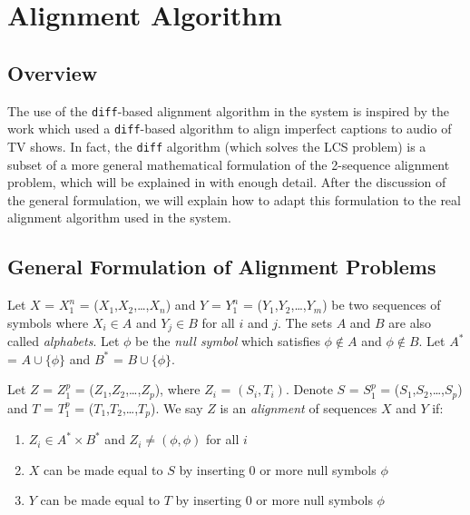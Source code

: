 
\chapter{Alignment Algorithm}
\label{chap:align}

\ifpdf
    \graphicspath{{Chapter5/Figs/Raster/}{Chapter5/Figs/PDF/}{Chapter5/Figs/}}
\else
    \graphicspath{{Chapter5/Figs/Vector/}{Chapter5/Figs/}}
\fi


\section{Overview}

The use of the \texttt{diff}-based alignment algorithm in the system is inspired by the work \cite{lanchantin2015development} which used a \texttt{diff}-based algorithm to align imperfect captions to audio of TV shows. In fact, the \texttt{diff} algorithm (which solves the LCS problem) is a subset of a more general mathematical formulation of the 2-sequence alignment problem, which will be explained in  with enough detail. After the discussion of the general formulation, we will explain how to adapt this formulation to the real alignment algorithm used in the system. 

\section{General Formulation of Alignment Problems}
\label{sec:diff-formulation}

Let $X$ = $X_1^n$ = ($X_1$,$X_2$,\ldots,$X_n$) and $Y$ = $Y_1^n$ = ($Y_1$,$Y_2$,\ldots,$Y_m$) be two sequences of symbols where $X_i \in A$ and $Y_j \in B$ for all $i$ and $j$. The sets $A$ and $B$ are also called \textit{alphabets}. Let $\phi$ be the \textit{null symbol} which satisfies $\phi \notin A$ and $\phi \notin B$. Let $A^*$ = $A\cup\{\phi\}$ and $B^*$ = $B\cup\{\phi\}$.

Let $Z$ = $Z_1^p$ = ($Z_1$,$Z_2$,\ldots,$Z_p$), where $Z_i$ = $(S_i, T_i)$. Denote $S$ = $S_1^p$ = ($S_1$,$S_2$,\ldots,$S_p$) and $T$ = $T_1^p$ = ($T_1$,$T_2$,\ldots,$T_p$). We say $Z$ is an \textit{alignment} of sequences $X$ and $Y$ if:
\begin{enumerate}
  \item $Z_i \in A^* \times B^*$ and $Z_i \neq (\phi,\phi)$ for all $i$
  \item $X$ can be made equal to $S$ by inserting 0 or more null symbols $\phi$
  \item $Y$ can be made equal to $T$ by inserting 0 or more null symbols $\phi$
\end{enumerate}

